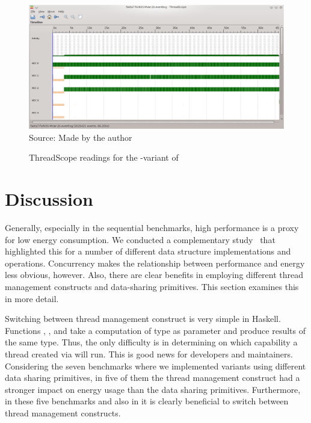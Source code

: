 \begin{figure}
\caption{ThreadScope readings for the \forkOS-\MVar variant of \fasta}
\centering
\includegraphics[width=\linewidth]{images/fasta-forkOS-MVar-20}
\footnotesize{Source: Made by the author}
\label{fig:threadscope2}
\end{figure}


\section{Discussion}\label{sec:discussion}
Generally, especially in the sequential benchmarks, high performance is a proxy for low energy consumption. We conducted a complementary study~\cite{lima:2016} that highlighted this for a number of different data structure implementations and operations. Concurrency makes the relationship between performance and energy less obvious, however. Also, there are clear benefits in employing  different thread management constructs and data-sharing primitives. This section examines this in more detail.

Switching between thread management construct is very simple in Haskell. Functions \forkOn, \forkIO, and \forkOS take a computation of type \IO as parameter and produce results of the same type. Thus, the only difficulty is in determining on which capability a thread created via \forkOn will run. This is good news for developers and maintainers. Considering the seven benchmarks where we implemented variants using different data sharing primitives, in five of them the thread management construct had a stronger impact on energy usage than the data sharing primitives. Furthermore, in these five benchmarks and also in \warp it is clearly beneficial to switch between thread management constructs.

